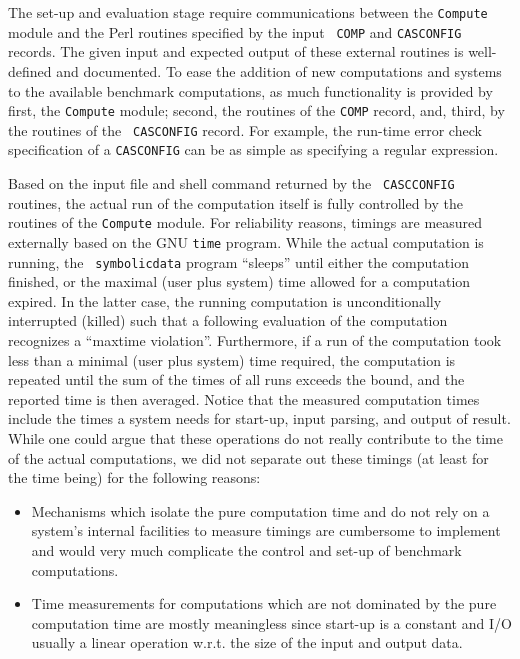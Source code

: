\documentclass[11pt,a4paper]{article}
\begin{document}
The set-up and evaluation stage require communications between the
{\tt Compute} module and the Perl routines specified by the input {\tt
  COMP} and {\tt CASCONFIG} records. The given input and expected
output of these external routines is well-defined and documented.
To ease the addition of new computations and systems to
the available benchmark computations, as much functionality is
provided by first, the {\tt Compute} module; second, the routines of
the {\tt COMP} record, and, third, by the routines of the {\tt
  CASCONFIG} record. For example, the run-time error check
specification of a {\tt CASCONFIG} can be as simple as specifying a
regular expression.

Based on the input file and shell command returned by the {\tt
CASCCONFIG} routines, the actual run of the computation itself is
fully controlled by the routines of the {\tt Compute} module. For
reliability reasons, timings are measured externally based on the GNU
{\tt time} program.  While the actual computation is running, the {\tt
symbolicdata} program ``sleeps'' until either the computation
finished, or the maximal (user plus system) time allowed for a
computation expired. In the latter case, the running computation is
unconditionally interrupted (killed) such that a following evaluation
of the computation recognizes a ``maxtime violation''. Furthermore, if
a run of the computation took less than a minimal (user plus system)
time required, the computation is repeated until the
sum of the times of all runs exceeds the bound, and the reported time
is then averaged. Notice that the measured computation times include
the times a system needs for start-up, input parsing, and output of
result.  While one could argue that these operations do not really
contribute to the time of the actual computations, we did not separate
out these timings (at least for the time being) for the following
reasons:
\begin{itemize}
\item Mechanisms which isolate the pure computation time and do not
  rely on a system's internal facilities to measure timings are
  cumbersome to implement and would very much complicate the control
  and set-up of benchmark computations.
\item Time measurements for computations which are not dominated by the 
  pure computation time are mostly meaningless since start-up is a
  constant and I/O usually a linear operation w.r.t. the size of the
  input and  output data. 
\end{itemize}
\end{document}
